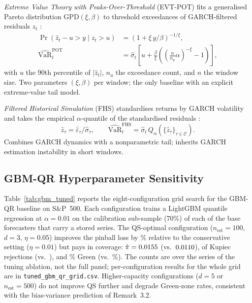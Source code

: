 \documentclass[preprint,11pt,authoryear]{elsarticle}
\newcommand{\VaR}{\mathrm{VaR}}
\newcommand{\1}{\boldsymbol{1}}
\begin{document}
\textit{Extreme Value Theory with Peaks-Over-Threshold} (EVT-POT) fits
a generalised Pareto distribution $\mathrm{GPD}(\xi,\beta)$ to
threshold exceedances of GARCH-filtered residuals $\hat z_t$
\citep{mcneil2000estimation}:
\begin{align}
	\label{eq:evt_pot_gpd}
	\Pr(\hat z_t-u>y\mid \hat z_t>u)
	&=\left(1+\xi\,y/\beta\right)^{-1/\xi}, \\
	\label{eq:evt_pot_var}
	\widehat{\VaR}_t^{\mathrm{POT}}
	&=\hat\sigma_t\!\left[
	u+\tfrac{\beta}{\xi}\!\left((\tfrac{n}{n_u}\alpha)^{-\xi}-1\right)
	\right],
\end{align}
with $u$ the 90th percentile of $|\hat z_t|$, $n_u$ the exceedance
count, and $n$ the window size. Two parameters $(\xi,\beta)$ per
window; the only baseline with an explicit extreme-value tail model.

\textit{Filtered Historical Simulation} (FHS) standardises returns by
GARCH volatility and takes the empirical $\alpha$-quantile of the
standardised residuals \citep{baroneadesi1999var}:
\begin{equation}
	\label{eq:fhs}
	\hat z_\tau=\hat\varepsilon_\tau/\hat\sigma_\tau,
	\qquad
	\widehat{\VaR}_t^{\mathrm{FHS}}
	=\hat\sigma_t\,Q_\alpha\!\left(\{\hat z_\tau\}_{\tau\in\mathcal C}\right).
\end{equation}
Combines GARCH dynamics with a nonparametric tail; inherits GARCH
estimation instability in short windows.

\subsection{GBM-QR Hyperparameter Sensitivity}
\label{app:gbm_tuned}

Table~\ref{tab:gbm_tuned} reports the eight-configuration grid search
for the GBM-QR baseline on S\&P~500.  Each configuration trains a
LightGBM quantile regression at $\alpha=0.01$ on the calibration
sub-sample (70\%) of each of the \nSupTunedSeries{} base forecasters
that carry a stored series. The QS-optimal
configuration ($n_\text{est}=100$, $d=3$, $\eta=0.05$) improves the
pinball loss by \nSupTunedQSGainPct\% relative to the conservative setting
($\eta=0.01$) but pays in coverage: $\hat\pi=0.0155$
(vs.\ $0.0110$), \nSupTunedKupBest{} of \nSupTunedSeries{} Kupiec
rejections (vs.\ \nSupTunedKupCons{}), and \nSupTunedGreenPctBest\% Green
(vs.\ \nSupTunedGreenPctCons\%). The counts are over the
\nSupTunedSeries{} series of the tuning ablation, not the full panel;
per-configuration results for the whole grid are in
\texttt{tuned\_gbm\_qr\_grid.csv}. Higher-capacity configurations
($d=5$ or $n_\text{est}=500$) do not improve QS further and degrade
Green-zone rates, consistent with the bias-variance prediction of
Remark~3.2.
\end{document}
